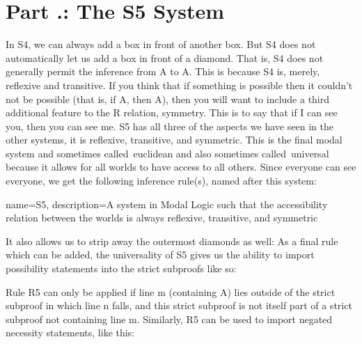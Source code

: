 \section{Part \thechapcount.\theseccount: The S5 System}
In S4, we can always add a box in front of another box. But S4 does not automatically let us add a box in front of a diamond. That is, S4 does not generally permit the inference from \ediamond A to \ebox \ediamond A. This is because S4 is, merely, reflexive and transitive. If you think that if something is possible then it couldn't not be possible (that is, if \ediamond A, then \ebox \ediamond A), then you will want to include a third additional feature to the R relation, symmetry. This is to say that if I can see you, then you can see me. \Gls{S5} has all three of the aspects we have seen in the other systems, it is reflexive, transitive, and symmetric. This is the final modal system and sometimes called euclidean and also sometimes called universal because it allows for all worlds to have access to all others. Since everyone can see everyone, we get the following inference rule(s), named after this system:\autocite[170]{Sider}

{
name=S5,
description={A system in Modal Logic such that the \gls{accessibility relation} between the \glspl{world} is always \gls{reflexive}, \gls{transitive}, and \gls{symmetric}}
}


It also allows us to strip away the outermost diamonds as well:
As a final rule which can be added, the universality of S5 gives us the ability to import possibility statements into the strict subproofs like so:

Rule R5 can only be applied if line m (containing \ediamond A) lies outside of the strict subproof in which line n falls, and this strict subproof is not itself part of a strict subproof not containing line m. Similarly, R5 can be used to import negated necessity statements, like this:
\begin{fitchproof}
\open
{} 
\end{fitchproof}

